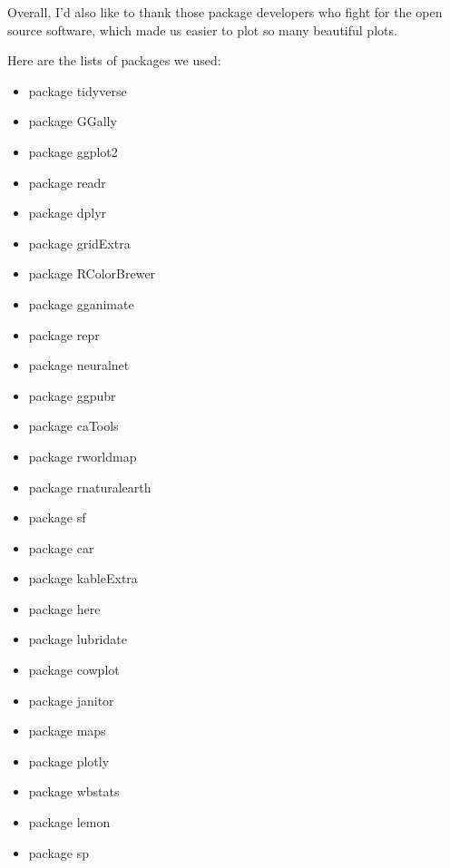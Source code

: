 \documentclass[11pt,a4paper,]{article}
\providecommand{\tightlist}{%
  \setlength{\itemsep}{0pt}\setlength{\parskip}{0pt}}
\begin{document}
Overall, I'd also like to thank those package developers who fight for the open source software, which made us easier to plot so many beautiful plots.

Here are the lists of packages we used:

\begin{itemize}
\tightlist
\item
  package tidyverse \autocite{tidyverse}
\item
  package GGally \autocite{GGally}
\item
  package ggplot2 \autocite{ggplot2}
\item
  package readr \autocite{readr}
\item
  package dplyr \autocite{dplyr}
\item
  package gridExtra \autocite{gridExtra}
\item
  package RColorBrewer \autocite{RColorBrewer}
\item
  package gganimate \autocite{gganimate}
\item
  package repr \autocite{repr}
\item
  package neuralnet \autocite{neuralnet}
\item
  package ggpubr \autocite{ggpubr}
\item
  package caTools \autocite{caTools}
\item
  package rworldmap \autocite{rworldmap}
\item
  package rnaturalearth \autocite{rnaturalearth}
\item
  package sf \autocite{sf}
\item
  package car \autocite{car}
\item
  package kableExtra \autocite{kableExtra}
\item
  package here \autocite{here}
\item
  package lubridate \autocite{lubridate}
\item
  package cowplot \autocite{cowplot}
\item
  package janitor \autocite{janitor}
\item
  package maps \autocite{maps}
\item
  package plotly \autocite{plotly}
\item
  package wbstats \autocite{wbstats}
\item
  package lemon \autocite{lemon}
\item
  package sp \autocite{sp}
\end{itemize}

\clearpage
\end{document}
